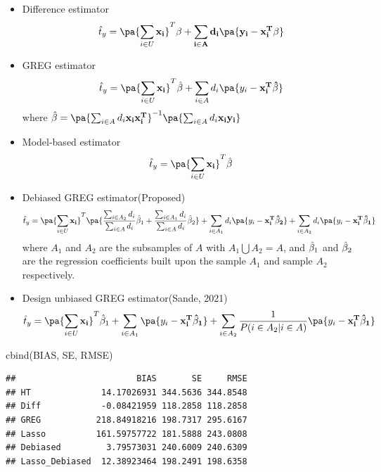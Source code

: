 \documentclass[
]{article}
\newenvironment{Shaded}{\begin{snugshade}}{\end{snugshade}}
\newcommand{\FunctionTok}[1]{\textcolor[rgb]{0.00,0.00,0.00}{#1}}
\newcommand{\NormalTok}[1]{#1}
\begin{document}
\begin{itemize}
  \item Difference estimator
  $$
  \hat t_y = \pa{\sum_{i \in U}\bf x_i}^T \bf \beta + \sum_{i \in A} d_i \pa{y_i - \bf x_i^T \bf \beta}
  $$
  \item GREG estimator
  $$
  \hat t_y = \pa{\sum_{i \in U}\bf x_i}^T \hat{\bf \beta} + \sum_{i \in A} d_i \pa{y_i - \bf x_i^T \hat{\bf \beta}}
  $$
  where $\hat {\bf \beta} = \pa{\sum_{i \in A} d_i \bf x_i \bf x_i^T}^{-1} \pa{\sum_{i \in A} d_i \bf x_i y_i}$
  
  \item Model-based estimator
  $$
  \hat t_y = \pa{\sum_{i \in U}\bf x_i}^T \hat{\bf \beta}
  $$
  
  \item Debiased GREG estimator(Proposed)
    $$
  \hat t_y = \pa{\sum_{i \in U}\bf x_i}^T \pa{ \frac{\sum_{i \in A_2}d_i}{\sum_{i \in A}d_i} \hat{\bf \beta}_1 + \frac{\sum_{i \in A_1}d_i}{\sum_{i \in A}d_i} \hat{\bf \beta}_2} + \sum_{i \in A_1} d_i \pa{y_i - \bf x_i^T \hat{\bf \beta}_2} + \sum_{i \in A_2} d_i \pa{y_i - \bf x_i^T \hat{\bf \beta}_1}
  $$
  where $A_1$ and $A_2$ are the subsamples of $A$ with $A_1 \bigcup A_2 = A$, and $\hat {\bf \beta}_1$ and $\hat {\bf \beta}_2$ are the regression coefficients built upon the sample $A_1$ and sample $A_2$ respectively.
  \item Design unbiased GREG estimator(Sande, 2021)
  $$
  \hat t_y = \pa{\sum_{i \in U}\bf x_i}^T \hat{\bf \beta}_1 + \sum_{i \in A_1} \pa{y_i - \bf x_i^T \hat{\bf \beta}_1} + \sum_{i \in A_2} \frac{1}{P(i \in A_2 | i \in A)} \pa{y_i - \bf x_i^T \hat{\bf \beta}_1}
  $$
  
\end{itemize}

\begin{Shaded}
\begin{Highlighting}[]
\FunctionTok{cbind}\NormalTok{(BIAS, SE, RMSE)}
\end{Highlighting}
\end{Shaded}

\begin{verbatim}
##                        BIAS       SE     RMSE
## HT              14.17026931 344.5636 344.8548
## Diff            -0.08421959 118.2858 118.2858
## GREG           218.84918216 198.7317 295.6167
## Lasso          161.59757722 181.5888 243.0808
## Debiased         3.79573031 240.6009 240.6309
## Lasso_Debiased  12.38923464 198.2491 198.6358
\end{verbatim}
\end{document}

